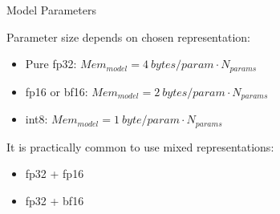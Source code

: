 
\begin{vbframe}{Model Parameters}

\vfill

Parameter size depends on chosen representation: \newline

\begin{itemize}
 	\item Pure fp32: $Mem_{model} = 4 ~bytes/param \cdot N_{params}$
 	\item fp16 or bf16: $Mem_{model} = 2 ~bytes/param \cdot N_{params}$
	\item int8: $Mem_{model} = 1 ~byte/param \cdot N_{params}$
\end{itemize}

\vskip8mm

It is practically common to use mixed representations: \newline

\begin{itemize}
 	\item fp32 + fp16
	\item fp32 + bf16
\end{itemize}

\vfill

\end{vbframe}


